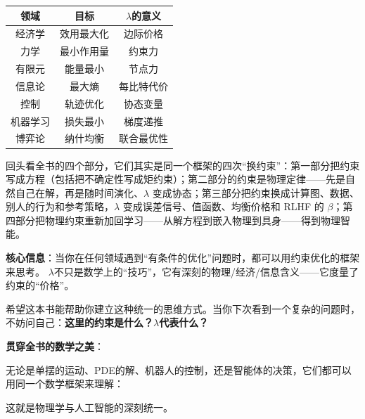 \documentclass[11pt,a4paper,twoside,openright]{book}
\theoremstyle{definition}
\begin{document}
\begin{center}
\begin{tabular}{c|c|c}
\toprule
\textbf{领域} & \textbf{目标} & \textbf{$\lambda$的意义} \\
\midrule
经济学 & 效用最大化 & 边际价格 \\
力学 & 最小作用量 & 约束力 \\
有限元 & 能量最小 & 节点力 \\
信息论 & 最大熵 & 每比特代价 \\
控制 & 轨迹优化 & 协态变量 \\
机器学习 & 损失最小 & 梯度递推 \\
博弈论 & 纳什均衡 & 联合最优性 \\
\bottomrule
\end{tabular}
\end{center}

\vspace{1em}

回头看全书的四个部分，它们其实是同一个框架的四次“换约束”：第一部分把约束写成方程（包括把不确定性写成矩约束）；第二部分的约束是物理定律——先是自然自己在解，再是随时间演化、$\lambda$ 变成协态；第三部分把约束换成计算图、数据、别人的行为和参考策略，$\lambda$ 变成误差信号、值函数、均衡价格和 RLHF 的 $\beta$；第四部分把物理约束重新加回学习——从解方程到嵌入物理到具身——得到物理智能。

\textbf{核心信息}：当你在任何领域遇到“有条件的优化”问题时，都可以用约束优化的框架来思考。
$\lambda$不只是数学上的“技巧”，它有深刻的物理/经济/信息含义——它度量了约束的“价格”。

希望这本书能帮助你建立这种统一的思维方式。当你下次看到一个复杂的问题时，
不妨问自己：\textbf{这里的约束是什么？$\lambda$代表什么？}




 



\begin{keyinsight}

\textbf{贯穿全书的数学之美}：

 

无论是单摆的运动、PDE的解、机器人的控制，还是智能体的决策，它们都可以用同一个数学框架来理解：

 

\begin{center}


\end{center}

 

这就是物理学与人工智能的深刻统一。

\end{keyinsight}
\end{document}
